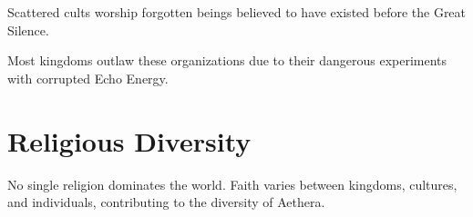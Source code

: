Scattered cults worship forgotten beings believed to have existed before the Great Silence.

Most kingdoms outlaw these organizations due to their dangerous experiments with corrupted Echo Energy.

\section{Religious Diversity}

No single religion dominates the world. Faith varies between kingdoms, cultures, and individuals, contributing to the diversity of Aethera.
